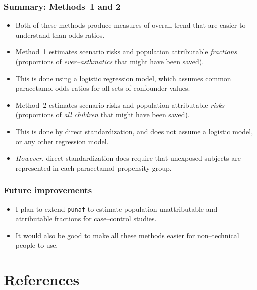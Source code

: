 \documentclass[11pt]{beamer}
\begin{document}
\begin{frame}
\frametitle{Summary: Methods~1 and 2}

\begin{itemize}

\item<2-> Both of these methods produce measures of overall trend
that are easier to understand than odds ratios.

\item<3-> Method~1 estimates scenario risks and population attributable \textit{fractions}
(proportions of \textit{ever--asthmatics} that might have been saved).

\item<4-> This is done using a logistic regression model,
which assumes common paracetamol odds ratios for all sets of confounder values.

\item<5-> Method~2 estimates scenario risks and population attributable \textit{risks}
(proportions of \textit{all children} that might have been saved).

\item<6-> This is done by direct standardization, and does not assume a logistic model,
or any other regression model.

\item<7-> \textit{However}, direct standardization does require that unexposed subjects
are represented in each paracetamol--propensity group.

\end{itemize}

\end{frame}

\begin{frame}
\frametitle{Future improvements}

\begin{itemize}

\item<2-> I plan to extend \texttt{punaf} to estimate population unattributable and attributable fractions for case--control studies.

\item<3-> It would also be good to make all these methods easier for non--technical people to use.

\end{itemize}

\end{frame}

\section{References}
\end{document}
